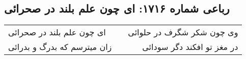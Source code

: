 \begin{center}
\section*{رباعی شماره ۱۷۱۶: ای چون علم بلند در صحرائی}
\label{sec:1716}
\begin{longtable}{l p{0.5cm} r}
ای چون علم بلند در صحرائی
&&
وی چون شکر شگرف در حلوائی
\\
زان میترسم که بدرگ و بدرائی
&&
در مغز تو افکند دگر سودائی
\\
\end{longtable}
\end{center}
